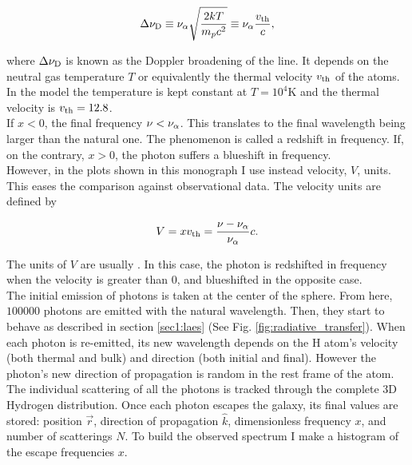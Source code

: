 \begin{equation}
\label{eq:delta_nuD}
\Delta\nu_{\rm D} \equiv \nu_{\rm \alpha}\sqrt{\frac{2kT}{m_pc^2}} \equiv \nu_{\rm \alpha} \frac{v_{\rm th}}{c},
\end{equation} 

where $\Delta\nu_{\rm D}$ is known as the Doppler broadening of the \lya line. It depends on the neutral gas temperature $T$ or equivalently the thermal velocity $v_{\rm th}$ of the atoms. In the model the temperature is kept constant at $T=10^4$K and the thermal velocity is $v_{\rm th}=12.8$\kms. \\

If $x < 0$, the final frequency $\nu < \nu_{\rm \alpha}$. This translates to the final wavelength being larger than the \lya natural one. The phenomenon is called a redshift in frequency. If, on the contrary, $x > 0$, the photon suffers a blueshift in frequency. \\

However, in the plots shown in this monograph I use instead velocity, $V$, units. This eases the comparison against observational data. The velocity units are defined by

\begin{equation}
\label{eq:V}
V = xv_{\rm th} = \frac{\nu -\nu_{\rm \alpha}}{\nu_{\rm \alpha}}c.
\end{equation}

The units of $V$ are usually \kms. In this case, the photon is redshifted in frequency when the velocity is greater than 0, and blueshifted in the opposite case. \\

The initial emission of photons is taken at the center of the sphere. From here, $100000$ photons are emitted with the natural \lya wavelength. Then, they start to behave as described in section \ref{sec1:laes} (See Fig. \ref{fig:radiative_transfer}). When each photon is re-emitted, its new wavelength depends on the H atom's velocity (both thermal and bulk) and direction (both initial and final). However the photon's new direction of propagation is random in the rest frame of the atom. \\ 

The individual scattering of all the photons is tracked through the complete 3D Hydrogen distribution. Once each photon escapes the galaxy, its final values are stored: position $\vec{r}$, direction of propagation $\hat{k}$, dimensionless frequency $x$, and number of scatterings $N$. To build the observed spectrum I make a histogram of the escape frequencies $x$.\\


